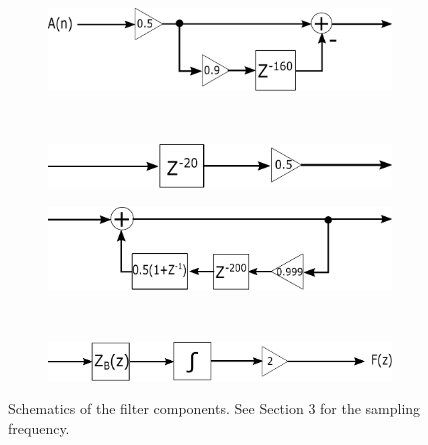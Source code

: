 \documentclass[a4paper]{article}
\begin{document}
\begin{figure}[h]
	\centering
	\begin{subfigure}{0.47\linewidth}
		\centering
		\includegraphics[width=0.9\linewidth]{H_E.pdf}
		\caption{}
		\label{fig:he}
	\end{subfigure}
	~
	\begin{subfigure}{0.47\linewidth}
		\centering
		\includegraphics[width=0.9\linewidth]{H_E1R1.pdf}
		\caption{}
		\label{fig:he1r1}
	\end{subfigure}

	\begin{subfigure}{0.47\linewidth}
		\centering
		\includegraphics[width=0.9\linewidth]{S.pdf}
		\caption{}
		\label{fig:s}
	\end{subfigure}
	~
	\begin{subfigure}[b]{0.47\linewidth}
		\centering
		\includegraphics[width=0.9\linewidth]{H_B.pdf}
		\caption{}
		\label{fig:hb}
	\end{subfigure}
	\caption{Schematics of the filter components. See Section 3 for the sampling frequency.}
\end{figure}
\end{document}
